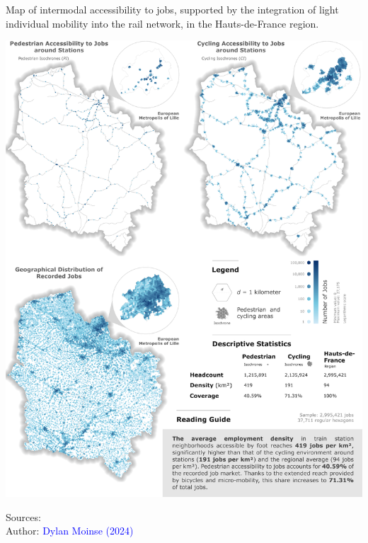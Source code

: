 \begin{refsegment}
\begin{carte}[h!]\vspace*{4pt}
    \caption{Map of intermodal accessibility to jobs, supported by the integration of light individual mobility into the rail network, in the Hauts-de-France region.}
    \label{fig-chap5:carte-accessibilite-emplois}
    \centerline{\includegraphics[width=1\columnwidth]{src/Figures/Chap-5/EN_Distances_Carte_emplois.png}}
    \vspace{5pt}
    \begin{flushright}\scriptsize{
    Sources: \textcolor{blue}{\textcite{repertoire_sirene_des_entreprises_et_de_leurs_etablissements_base_2024}}
    \\
    Author: \textcolor{blue}{Dylan Moinse (2024)}
    }\end{flushright}
\end{carte}


\end{refsegment}
